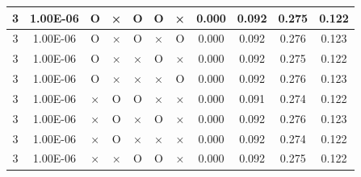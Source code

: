 \documentclass[11pt]{article}
\begin{document}
\begin{longtable}[h]{|r|r|l|l|l|l|l|r|r|l|r|}
\multicolumn{1}{|c|}{3} & \multicolumn{1}{c|}{1.00E-06} & \multicolumn{1}{c|}{O} & \multicolumn{1}{c|}{×} & \multicolumn{1}{c|}{O} & \multicolumn{1}{c|}{O} & \multicolumn{1}{c|}{×} & \multicolumn{1}{c|}{0.000} & \multicolumn{1}{c|}{0.092} & \multicolumn{1}{c|}{0.275} & \multicolumn{1}{c|}{0.122} \\ \hline
\multicolumn{1}{|c|}{3} & \multicolumn{1}{c|}{1.00E-06} & \multicolumn{1}{c|}{O} & \multicolumn{1}{c|}{×} & \multicolumn{1}{c|}{O} & \multicolumn{1}{c|}{×} & \multicolumn{1}{c|}{O} & \multicolumn{1}{c|}{0.000} & \multicolumn{1}{c|}{0.092} & \multicolumn{1}{c|}{0.276} & \multicolumn{1}{c|}{0.123} \\ \hline
\multicolumn{1}{|c|}{3} & \multicolumn{1}{c|}{1.00E-06} & \multicolumn{1}{c|}{O} & \multicolumn{1}{c|}{×} & \multicolumn{1}{c|}{×} & \multicolumn{1}{c|}{O} & \multicolumn{1}{c|}{×} & \multicolumn{1}{c|}{0.000} & \multicolumn{1}{c|}{0.092} & \multicolumn{1}{c|}{0.275} & \multicolumn{1}{c|}{0.122} \\ \hline
\multicolumn{1}{|c|}{3} & \multicolumn{1}{c|}{1.00E-06} & \multicolumn{1}{c|}{O} & \multicolumn{1}{c|}{×} & \multicolumn{1}{c|}{×} & \multicolumn{1}{c|}{×} & \multicolumn{1}{c|}{O} & \multicolumn{1}{c|}{0.000} & \multicolumn{1}{c|}{0.092} & \multicolumn{1}{c|}{0.276} & \multicolumn{1}{c|}{0.123} \\ \hline
\multicolumn{1}{|c|}{3} & \multicolumn{1}{c|}{1.00E-06} & \multicolumn{1}{c|}{×} & \multicolumn{1}{c|}{O} & \multicolumn{1}{c|}{O} & \multicolumn{1}{c|}{×} & \multicolumn{1}{c|}{×} & \multicolumn{1}{c|}{0.000} & \multicolumn{1}{c|}{0.091} & \multicolumn{1}{c|}{0.274} & \multicolumn{1}{c|}{0.122} \\ \hline
\multicolumn{1}{|c|}{3} & \multicolumn{1}{c|}{1.00E-06} & \multicolumn{1}{c|}{×} & \multicolumn{1}{c|}{O} & \multicolumn{1}{c|}{×} & \multicolumn{1}{c|}{O} & \multicolumn{1}{c|}{×} & \multicolumn{1}{c|}{0.000} & \multicolumn{1}{c|}{0.092} & \multicolumn{1}{c|}{0.276} & \multicolumn{1}{c|}{0.123} \\ \hline
\multicolumn{1}{|c|}{3} & \multicolumn{1}{c|}{1.00E-06} & \multicolumn{1}{c|}{×} & \multicolumn{1}{c|}{O} & \multicolumn{1}{c|}{×} & \multicolumn{1}{c|}{×} & \multicolumn{1}{c|}{×} & \multicolumn{1}{c|}{0.000} & \multicolumn{1}{c|}{0.092} & \multicolumn{1}{c|}{0.274} & \multicolumn{1}{c|}{0.122} \\ \hline
\multicolumn{1}{|c|}{3} & \multicolumn{1}{c|}{1.00E-06} & \multicolumn{1}{c|}{×} & \multicolumn{1}{c|}{×} & \multicolumn{1}{c|}{O} & \multicolumn{1}{c|}{O} & \multicolumn{1}{c|}{×} & \multicolumn{1}{c|}{0.000} & \multicolumn{1}{c|}{0.092} & \multicolumn{1}{c|}{0.275} & \multicolumn{1}{c|}{0.122} \\ \hline

\end{longtable}
\end{document}
